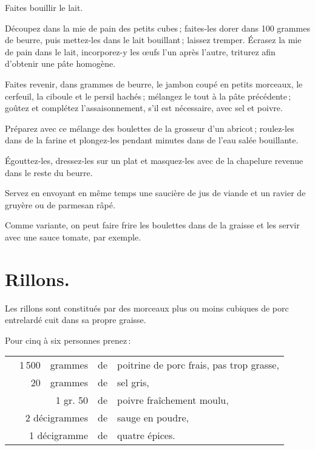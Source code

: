 Faites bouillir le lait.

Découpez dans la mie de pain des petits cubes ; faites-les dorer dans 100
grammes de beurre, puis mettez-les dans le lait bouillant ; laissez tremper.
Écrasez la mie de pain dans le lait, incorporez-y les œufs l'un après l'autre,
triturez afin d'obtenir une pâte homogène.

Faites revenir, dans {\mmm} grammes de beurre, le jambon coupé en petits morceaux,
le cerfeuil, la ciboule et le persil hachés ; mélangez le tout à la pâte
précédente ; goûtez et complétez l'assaisonnement, s'il est nécessaire, avec
sel et poivre.

Préparez avec ce mélange des boulettes de la grosseur d'un abricot ; roulez-les
dans de la farine et plongez-les pendant {\mmm} minutes dans de l'eau salée
bouillante.

Égouttez-les, dressez-les sur un plat et masquez-les avec de la chapelure
revenue dans le reste du beurre.

Servez en envoyant en même temps une saucière de jus de viande et un ravier
de gruyère ou de parmesan râpé.

\sk

Comme variante, on peut faire frire les boulettes dans de la graisse et les
servir avec une sauce tomate, par exemple.

\section*{\centering Rillons.}
{}

Les rillons sont constitués par des morceaux plus ou moins cubiques de porc
entrelardé cuit dans sa propre graisse.

Pour cinq à six personnes prenez :

\medskip

\footnotesize
\begin{longtable}{rrrrp{16em}}
 &  1 500 & grammes & de & poitrine de porc frais, pas trop grasse,                                       \\
 &     20 & grammes & de & sel gris,                                                                      \\
 &      & 1 gr. 50  & de & poivre fraîchement moulu,                                                      \\
 &  \multicolumn{2}{r}{2 décigrammes} & de & sauge en poudre,                                             \\
 &  \multicolumn{2}{r}{1 décigramme}  & de & quatre épices.                                               \\
\end{longtable}
\normalsize

